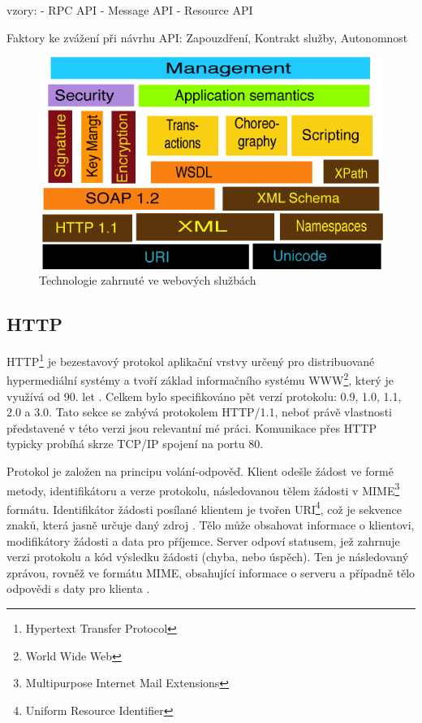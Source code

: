 \documentclass[czech,DP]{thesiskiv}
\begin{document}
vzory:
- RPC API
- Message API
- Resource API

Faktory ke zvážení při návrhu API\cite{wsApiStyles}: Zapouzdření, Kontrakt služby, Autonomnost 

\begin{figure}
	\centering
	\includegraphics[width=\linewidth]{ws-tech-stack.png}
	\caption{Technologie zahrnuté ve webových službách}
	\label{fig:ws-tech-stack}	
\end{figure}

\subsection{HTTP}

HTTP\footnote{Hypertext Transfer Protocol} je bezestavový protokol aplikační vrstvy určený pro distribuované hypermediální systémy a tvoří základ informačního systému WWW\footnote{World Wide Web}, který je využívá od 90. let \cite{httpRfc}. Celkem bylo specifikováno pět verzí protokolu: 0.9, 1.0, 1.1, 2.0 a 3.0. Tato sekce se zabývá protokolem HTTP/1.1, neboť právě vlastnosti představené v této verzi jsou relevantní mé práci. Komunikace přes HTTP typicky probíhá skrze TCP/IP spojení na portu 80. 

Protokol je založen na principu volání-odpověď. Klient odešle žádost ve formě metody, identifikátoru a verze protokolu, následovanou tělem žádosti v MIME\footnote{Multipurpose Internet Mail Extensions} formátu. Identifikátor žádosti posílané klientem je tvořen URI\footnote{Uniform Resource Identifier}, což je sekvence znaků, která jasně určuje daný zdroj \cite{uriRfc}. Tělo může obsahovat informace o klientovi, modifikátory žádosti a data pro příjemce. Server odpoví statusem, jež zahrnuje verzi protokolu a kód výsledku žádosti (chyba, nebo úspěch). Ten je následovaný zprávou, rovněž ve formátu MIME, obsahující informace o serveru a případně tělo odpovědi s daty pro klienta \cite{httpRfc}.
\end{document}
